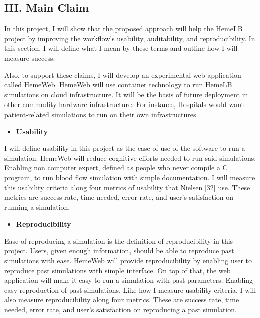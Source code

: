 \documentclass[]{article}
\providecommand{\tightlist}{%
  \setlength{\itemsep}{0pt}\setlength{\parskip}{0pt}}
\begin{document}
\subsection{III. Main Claim}\label{iii.-main-claim}

In this project, I will show that the proposed approach will help the
HemeLB project by improving the workflow's usability, auditability, and
reproducibility. In this section, I will define what I mean by these
terms and outline how I will measure success.

Also, to support these claims, I will develop an experimental web
application called HemeWeb. HemeWeb will use container technology to run
HemeLB simulations on cloud infrastructure. It will be the basis of
future deployment in other commodity hardware infrastructure. For
instance, Hospitals would want patient-related simulations to run on
their own infrastructures.

\begin{itemize}
\tightlist
\item
  \textbf{Usability}
\end{itemize}

I will define usability in this project as the ease of use of the
software to run a simulation. HemeWeb will reduce cognitive efforts
needed to run said simulations. Enabling non computer expert, defined as
people who never compile a C program, to run blood flow simulation with
simple documentation. I will measure this usability criteria along four
metrics of usability that Nielsen {[}32{]} use. These metrics are
success rate, time needed, error rate, and user's satisfaction on
running a simulation.

\begin{itemize}
\tightlist
\item
  \textbf{Reproducibility}
\end{itemize}

Ease of reproducing a simulation is the definition of reproducibility in
this project. Users, given enough information, should be able to
reproduce past simulations with ease. HemeWeb will provide
reproducibility by enabling user to reproduce past simulations with
simple interface. On top of that, the web application will make it easy
to run a simulation with past parameters. Enabling easy reproduction of
past simulations. Like how I measure usability criteria, I will also
measure reproducibility along four metrics. These are success rate, time
needed, error rate, and user's satisfaction on reproducing a past
simulation.
\end{document}
